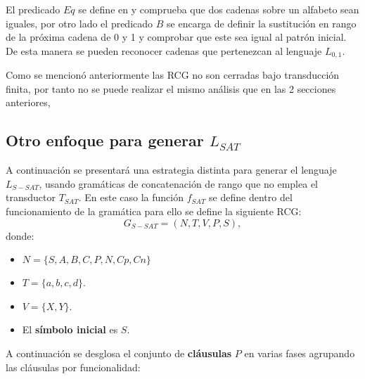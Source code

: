 \documentclass[12pt]{article}
\begin{document}
El predicado $Eq$ se define en \cite{mainRCGBib} y comprueba que dos cadenas sobre un alfabeto sean iguales, 
por otro lado el predicado $B$ se encarga de definir la sustitución en rango de la próxima cadena de 0 y 1 y 
comprobar que este sea igual al patrón inicial. De esta manera se pueden reconocer cadenas que pertenezcan al lenguaje $L_{0,1}$.

Como se mencionó anteriormente las RCG no son cerradas bajo transducción finita, por tanto no se puede realizar el mismo 
análisis que en las 2 secciones anteriores,  


\subsection{Otro enfoque para generar $L_{SAT}$}

A continuación se presentará una estrategia distinta para generar el lenguaje $L_{S-SAT}$, 
usando gramáticas de concatenación de rango que no emplea el transductor $T_{SAT}$.
En este caso la función $f_{SAT}$ se define dentro del funcionamiento de la gramática para ello se define la siguiente RCG:
\[
    G_{S-SAT} = (N, T, V, P, S),
\]
donde:

\begin{itemize}
    \item $N=\{S,A,B,C,P,N,Cp,Cn\}$
    \item $T=\{a,b,c,d\}$.
    \item $V=\{X,Y\}$.
    \item El \textbf{símbolo inicial} es $S$.
\end{itemize}

A continuación se desglosa el conjunto de \textbf{cláusulas} $P$ en varias fases agrupando las cláusulas
por funcionalidad:
\end{document}
